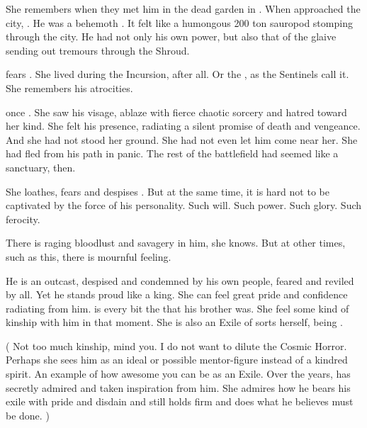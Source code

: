 She remembers \Ishnaruchaefir when they met him in the dead garden in \Malcur. 
When \Ishnaruchaefir{} approached the city, \Achsah{} . 
He was a behemoth \vertex. 
It felt like a humongous 200 ton sauropod stomping through the city. 
He had not only his own \vertex{} power, but also that of the glaive sending out tremours through the Shroud. 

\Achsah fears \Ishnaruchaefir.
She lived during the Incursion, after all. 
Or the \secondbanewar, as the Sentinels call it. 
She remembers his atrocities. 

\Achsah once . 
She saw his visage, ablaze with fierce chaotic sorcery and hatred toward her kind. 
She felt his presence, radiating a silent promise of death and vengeance. 
And she had not stood her ground. 
She had not even let him come near her. 
She had fled from his path in panic. 
The rest of the battlefield had seemed like a sanctuary, then. 

\begin{prose}
\end{prose}



She loathes, fears and despises \Ishnaruchaefir. 
But at the same time, it is hard not to be captivated by the force of his personality. 
Such will. 
Such power. 
Such glory. 
Such ferocity. 

There is raging bloodlust and savagery in him, she knows. 
But at other times, such as this, there is mournful feeling. 

He is an outcast, despised and condemned by his own people, feared and reviled by all. 
Yet he stands proud like a king. 
She can feel great pride and confidence radiating from him.
\Ishnaruchaefir is every bit the \dragonking{} that his brother \Nexagglachel{} was. 
She feel some kind of kinship with him in that moment. 
She is also an Exile of sorts herself, being \ashenblooded. 

(%
  Not too much kinship, mind you. 
  I do not want to dilute the Cosmic Horror.
  Perhaps she sees him as an ideal or possible mentor-figure instead of a kindred spirit.
  An example of how awesome you can be as an Exile.
  Over the years, \Achsah has secretly admired \Ishnaruchaefir and taken inspiration from him.
  She admires how he bears his exile with pride and disdain and still holds firm and does what he believes must be done.%
)

\begin{prose}
\end{prose}









